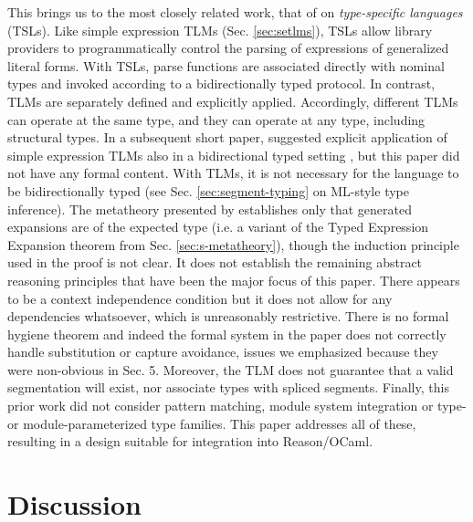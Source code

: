 \documentclass[acmsmall]{acmart}
\begin{document}
This brings us to the most closely related work, that of \citet{TSLs} on \emph{type-specific languages} (TSLs). Like simple expression TLMs (Sec. \ref{sec:setlms}), TSLs allow library providers to programmatically control the parsing of expressions of generalized literal forms. With TSLs, parse functions are associated directly with nominal types and invoked according to a bidirectionally typed protocol. In contrast, TLMs are separately defined and explicitly applied. Accordingly, different TLMs can operate at the same type, and they can operate at any type, including structural types.  In a subsequent short paper, \citet{sac15} suggested explicit application of simple expression TLMs  also in a bidirectional typed setting \cite{Pierce:2000:LTI:345099.345100}, but this paper did not have any formal content. With TLMs, it is not necessary for the language to be bidirectionally typed (see Sec. \ref{sec:segment-typing} on ML-style type inference). %
The metatheory presented by \citet{TSLs} establishes only that generated expansions are of the expected type (i.e. a variant of the Typed Expression Expansion theorem from Sec. \ref{sec:s-metatheory}), though the induction principle used in the proof is not clear. It does not establish the remaining abstract reasoning principles that have been the major focus of this paper. There appears to be a context independence condition but it does not allow for any dependencies whatsoever, which is unreasonably restrictive. There is no formal hygiene theorem and indeed the formal system in the paper does not correctly handle substitution or capture avoidance, issues we emphasized because they were non-obvious in Sec. 5. Moreover, the TLM does not guarantee that a valid segmentation will exist, nor associate types with spliced segments. Finally, this prior work did not consider pattern matching, module system integration or type- or module-parameterized type families. This paper addresses all of these, resulting in a design suitable for integration into Reason/OCaml.


\section{Discussion}
\label{sec:discussion}
\label{sec:conclusion}
\end{document}
